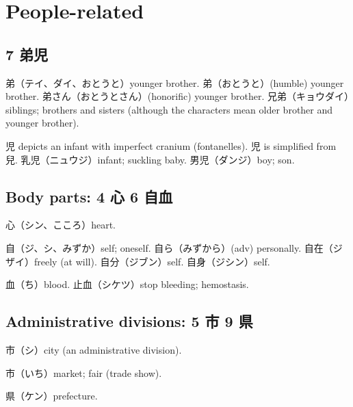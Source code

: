 \section{People-related}

\subsection{7 弟児}

弟（テイ、ダイ、おとうと）younger brother.
弟（おとうと）(humble) younger brother.
弟さん（おとうとさん）(honorific) younger brother.
兄弟（キョウダイ）siblings;
brothers and sisters
(although the characters mean older brother and younger brother).

児 depicts an infant with imperfect cranium (fontanelles).
児 is simplified from 兒.
乳児（ニュウジ）infant; suckling baby.
男児（ダンジ）boy; son.

\subsection{Body parts: 4 心 6 自血}

心（シン、こころ）heart.

自（ジ、シ、みずか）self; oneself.
自ら（みずから）(adv) personally.
自在（ジザイ）freely (at will).
自分（ジブン）self.
自身（ジシン）self.

血（ち）blood.
止血（シケツ）stop bleeding; hemostasis.

\subsection{Administrative divisions: 5 市 9 県}


市（シ）city (an administrative division).

市（いち）market; fair (trade show).

県（ケン）prefecture.
